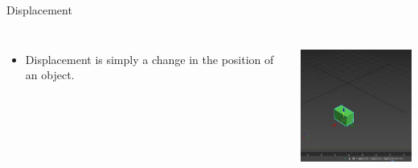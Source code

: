\documentclass[]{beamer}
\begin{document}
  
  

  \begin{frame}
    Displacement 
    \vspace{3 mm}
    
    
    
       \begin{columns}[c]
       \column{2in}  %
      
    
    
    \begin{itemize}
    \item Displacement is simply a change in the position of an object. 
    
    
    \end{itemize}
    
    
       \column{2in}
    
    
    
    
      \begin{center}
      \includegraphics[height=1.7in]{images/dis3d1.jpg}
    \end{center}
    
    
       \end{columns}
    
     \end{frame}
\end{document}
